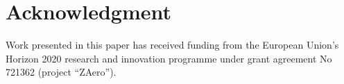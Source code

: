 \documentclass[conference]{IEEEtran}
\begin{document}
\section*{Acknowledgment}

Work presented in this paper has received funding from the European Union’s Horizon 2020 research and innovation programme under grant agreement No 721362 (project “ZAero”).

\small





\end{document}
